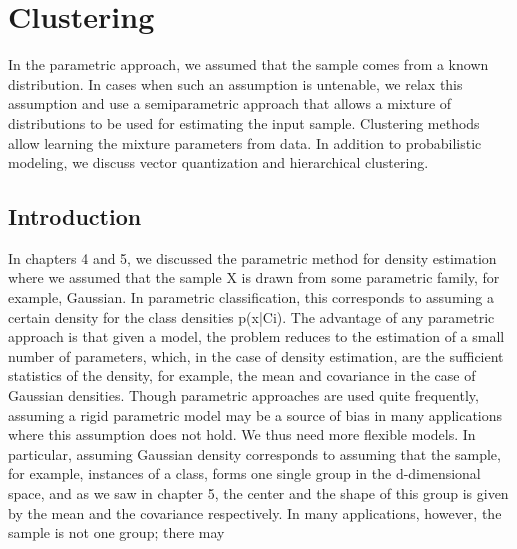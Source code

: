 \chapter{Clustering}
\label{chap:07-clustering}

In the parametric approach, we assumed that the sample comes from a known distribution. In cases when such an assumption is untenable, we relax this assumption and use a semiparametric approach that allows a mixture of distributions to be used for estimating the input sample. Clustering methods allow learning the mixture parameters from data. In addition to probabilistic modeling, we discuss vector quantization and hierarchical clustering.

\section{Introduction}

In chapters 4 and 5, we discussed the parametric method for density estimation where we assumed that the sample X is drawn from some parametric family, for example, Gaussian. In parametric classification, this corresponds to assuming a certain density for the class densities p(x|Ci). The advantage of any parametric approach is that given a model, the problem reduces to the estimation of a small number of parameters, which, in the case of density estimation, are the sufficient statistics of the density, for example, the mean and covariance in the case of Gaussian densities. Though parametric approaches are used quite frequently, assuming a rigid parametric model may be a source of bias in many applications where this assumption does not hold. We thus need more flexible models. In particular, assuming Gaussian density corresponds to assuming that the sample, for example, instances of a class, forms one single group in the d-dimensional space, and as we saw in chapter 5, the center and the shape of this group is given by the mean and the covariance respectively. In many applications, however, the sample is not one group; there may


